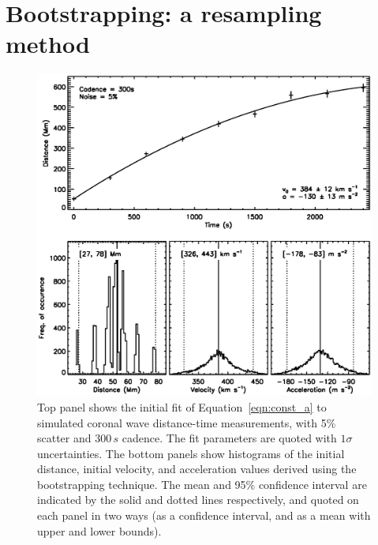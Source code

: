 \documentclass[structabstract]{aa}
\begin{document}
\section{Bootstrapping: a resampling method}
\label{sect:bootstrapping}

\begin{figure}
\begin{center}
\includegraphics[scale=0.45, trim=20 50 0 0, clip=true]{images/cad_boot_weight_5percent_300s.eps}
\caption{Top panel shows the initial fit of Equation~\ref{eqn:const_a} to simulated coronal wave distance-time measurements, with 5\% scatter and $300\,s$ cadence. The fit parameters are quoted with $1\sigma$ uncertainties. The bottom panels show histograms of the initial distance, initial velocity, and acceleration values derived using the bootstrapping technique. The mean and 95\% confidence interval are indicated by the solid and dotted lines respectively, and quoted on each panel in two ways (as a confidence interval, and as a mean with upper and lower bounds).}
\label{cad_boot_weight}
\end{center}
\end{figure}
\end{document}
